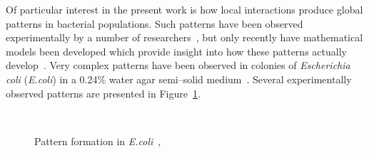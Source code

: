 Of particular interest in the present work is how local interactions produce global patterns in bacterial populations.  Such patterns have been observed experimentally by a number of researchers~\cite{berg_patterns_nature}, but only recently have mathematical models been developed which provide insight into how these patterns actually develop~\cite{spatial_patters_in_bio}.  Very complex patterns have been observed in colonies of \emph{Escherichia coli} (\emph{E.coli}) in a 0.24\% water agar semi--solid medium~\cite{berg_patterns_ecoli}.  Several experimentally observed patterns are presented in Figure~\ref{fig:ecoli_patterns_nature}.
\begin{figure}
  \begin{center}
     \\
    
    \caption[Pattern formation in \emph{E.coli}]{Pattern formation in \emph{E.coli}~\cite{berg_patterns_ecoli},\cite{berg_patterns_nature}\label{fig:ecoli_patterns_nature}}
  \end{center}
\end{figure}

